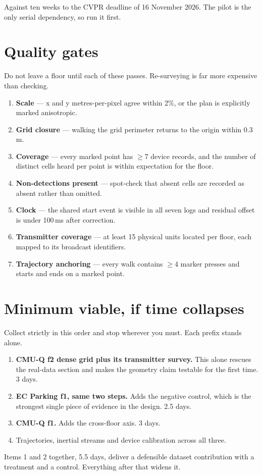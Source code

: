\documentclass[11pt,a4paper]{article}
\begin{document}
Against ten weeks to the CVPR deadline of 16 November 2026. The pilot is the only serial
dependency, so run it first.

\section{Quality gates}

Do not leave a floor until each of these passes. Re-surveying is far more expensive than
checking.

\begin{enumerate}
\item \textbf{Scale} --- x and y metres-per-pixel agree within 2\%, or the plan is
explicitly marked anisotropic.
\item \textbf{Grid closure} --- walking the grid perimeter returns to the origin within
0.3\,m.
\item \textbf{Coverage} --- every marked point has $\ge$7 device records, and the number
of distinct cells heard per point is within expectation for the floor.
\item \textbf{Non-detections present} --- spot-check that absent cells are recorded as
absent rather than omitted.
\item \textbf{Clock} --- the shared start event is visible in all seven logs and residual
offset is under 100\,ms after correction.
\item \textbf{Transmitter coverage} --- at least 15 physical units located per floor, each
mapped to its broadcast identifiers.
\item \textbf{Trajectory anchoring} --- every walk contains $\ge$4 marker presses and
starts and ends on a marked point.
\end{enumerate}

\section{Minimum viable, if time collapses}

Collect strictly in this order and stop wherever you must. Each prefix stands alone.

\begin{enumerate}
\item \textbf{CMU-Q f2 dense grid plus its transmitter survey.} This alone rescues the
real-data section and makes the geometry claim testable for the first time. 3 days.
\item \textbf{EC Parking f1, same two steps.} Adds the negative control, which is the
strongest single piece of evidence in the design. 2.5 days.
\item \textbf{CMU-Q f1.} Adds the cross-floor axis. 3 days.
\item Trajectories, inertial streams and device calibration across all three.
\end{enumerate}

Items 1 and 2 together, 5.5 days, deliver a defensible dataset contribution with a
treatment and a control. Everything after that widens it.
\end{document}
